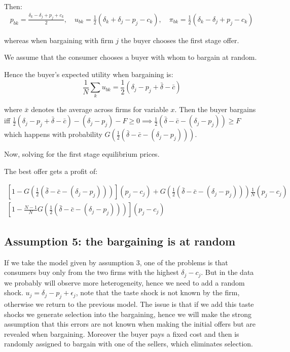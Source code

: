 \documentclass[12pt]{article}
\theoremstyle{plain}
\theoremstyle{plain}
\begin{document}
Then: 
\begin{align*}
p_{bk} = \frac{\delta_k - \delta_j + p_j + c_k}{2} ,\quad u_{bk} = \frac{1}{2}(\delta_k + \delta_j - p_j - c_k), \quad \pi_{bk} = \frac{1}{2}(\delta_k - \delta_j + p_j - c_k)
\end{align*}

whereas when bargaining with firm $j$ the buyer chooses the first stage offer. 

We assume that the consumer chooses a buyer with whom to bargain at random. 

Hence the buyer's expected utility when bargaining is: 
$$ \frac{1}{N}\sum_{k} u_{bk} = \frac{1}{2}(\delta_j - p_j + \bar{\delta} - \bar{c})$$

where $\bar{x}$ denotes the average across firms for variable $x$. 
Then the buyer bargains iff $\frac{1}{2}(\delta_j - p_j + \bar{\delta} - \bar{c}) - (\delta_j - p_j) - F \geq 0 \implies 
\frac{1}{2}(\bar{\delta} - \bar{c} - (\delta_j - p_j)) \geq F$ which happens with probability $G(\frac{1}{2}(\bar{\delta} - \bar{c} - (\delta_j - p_j)))$.

Now, solving for the first stage equilibrium prices. 

The best offer gets a profit of: 

\begin{align*}
    \left[1-G \left(\frac{1}{2}(\bar{\delta} - \bar{c} - (\delta_j - p_j))\right)\right] (p_j - c_j)+ G \left(\frac{1}{2}(\bar{\delta} - \bar{c} - (\delta_j - p_j))\right) \frac{1}{N}( p_j -c_j ) \\  \left[1-\frac{N-1}{N}G \left(\frac{1}{2}(\bar{\delta} - \bar{c} - (\delta_j - p_j))\right)\right] (p_j - c_j)
\end{align*}

\vspace{2cm}






\subsection*{Assumption 5: the bargaining is at random}

If we take the model given by assumption 3, one of the problems is that consumers buy only from the two firms with the highest $\delta_j - c_j$. But in the data we probably will observe more heterogeneity, hence we need to add a random shock. $u_j = \delta_j - p_j + \epsilon_j$, note that the taste shock is not known by the firm, otherwise we return to the previous model. The issue is that if we add this taste shocks we generate selection into the bargaining, hence we will make the strong assumption that this errors are not known when making the initial offers but are revealed when bargaining. Moreover the buyer pays a fixed cost and then is randomly assigned to bargain with one of the sellers, which eliminates selection. 
\end{document}
